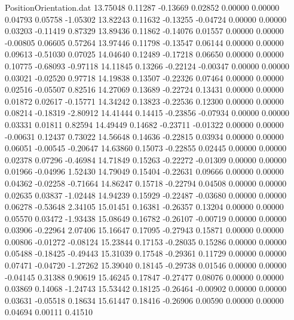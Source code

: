 \begin{filecontents}{PositionOrientation.dat}
  13.75048    0.11287   -0.13669     0.02852    0.00000    0.00000    0.04793    0.05758   -1.05302
  13.82243    0.11632   -0.13255    -0.04724    0.00000    0.00000    0.03203   -0.11419    0.87329
  13.89436    0.11862   -0.14076     0.01557    0.00000    0.00000   -0.00805    0.06605    0.57264
  13.97446    0.11798   -0.13547     0.06144    0.00000    0.00000    0.09613   -0.51030    0.07025
  14.04640    0.12489   -0.17218     0.06650    0.00000    0.00000    0.10775   -0.68093   -0.97118
  14.11845    0.13266   -0.22124    -0.00347    0.00000    0.00000    0.03021   -0.02520    0.97718
  14.19838    0.13507   -0.22326     0.07464    0.00000    0.00000    0.02516   -0.05507    0.82516
  14.27069    0.13689   -0.22724     0.13431    0.00000    0.00000    0.01872    0.02617   -0.15771
  14.34242    0.13823   -0.22536     0.12300    0.00000    0.00000    0.08214   -0.18319   -2.80912
  14.41444    0.14415   -0.23856    -0.07934    0.00000    0.00000    0.03331    0.01811    0.82594
  14.49449    0.14682   -0.23711    -0.01322    0.00000    0.00000   -0.00631    0.12437    0.73022
  14.56648    0.14636   -0.22815     0.03934    0.00000    0.00000    0.06051   -0.00545   -0.20647
  14.63860    0.15073   -0.22855     0.02445    0.00000    0.00000    0.02378    0.07296   -0.46984
  14.71849    0.15263   -0.22272    -0.01309    0.00000    0.00000    0.01966   -0.04996    1.52430
  14.79049    0.15404   -0.22631     0.09666    0.00000    0.00000    0.04362   -0.02258   -0.71664
  14.86247    0.15718   -0.22794     0.04508    0.00000    0.00000    0.02635    0.03837   -1.02448
  14.94239    0.15929   -0.22487    -0.03680    0.00000    0.00000    0.06278   -0.53648    2.34105
  15.01451    0.16381   -0.26357     0.13204    0.00000    0.00000    0.05570    0.03472   -1.93438
  15.08649    0.16782   -0.26107    -0.00719    0.00000    0.00000    0.03906   -0.22964    2.07406
  15.16647    0.17095   -0.27943     0.15871    0.00000    0.00000    0.00806   -0.01272   -0.08124
  15.23844    0.17153   -0.28035     0.15286    0.00000    0.00000    0.05488   -0.18425   -0.49443
  15.31039    0.17548   -0.29361     0.11729    0.00000    0.00000    0.07471   -0.04720   -1.27262
  15.39040    0.18145   -0.29738     0.01546    0.00000    0.00000   -0.04145    0.31388    0.90619
  15.46245    0.17847   -0.27477     0.08076    0.00000    0.00000    0.03869    0.14068   -1.24743
  15.53442    0.18125   -0.26464    -0.00902    0.00000    0.00000    0.03631   -0.05518    0.18634
  15.61447    0.18416   -0.26906     0.00590    0.00000    0.00000    0.04694    0.00111    0.41510

\end{filecontents}

